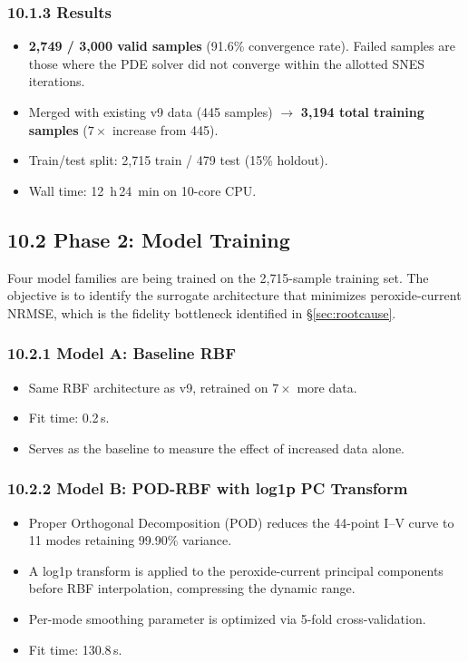 \documentclass[11pt]{article}
\begin{document}
\subsubsection*{10.1.3 Results}

\begin{itemize}
  \item \textbf{2{,}749 / 3{,}000 valid samples} (91.6\% convergence rate).
        Failed samples are those where the PDE solver did not converge within
        the allotted SNES iterations.
  \item Merged with existing v9 data (445 samples) $\to$
        \textbf{3{,}194 total training samples} ($7\times$ increase from 445).
  \item Train/test split: 2{,}715 train / 479 test (15\% holdout).
  \item Wall time: \SI{12}{h}\,\SI{24}{min} on 10-core CPU.
\end{itemize}

\subsection*{10.2 Phase 2: Model Training}

Four model families are being trained on the 2{,}715-sample training set.
The objective is to identify the surrogate architecture that minimizes
peroxide-current NRMSE, which is the fidelity bottleneck identified in
\S\ref{sec:rootcause}.

\subsubsection*{10.2.1 Model A: Baseline RBF}

\begin{itemize}
  \item Same RBF architecture as v9, retrained on $7\times$ more data.
  \item Fit time: 0.2\,s.
  \item Serves as the baseline to measure the effect of increased data alone.
\end{itemize}

\subsubsection*{10.2.2 Model B: POD-RBF with log1p PC Transform}

\begin{itemize}
  \item Proper Orthogonal Decomposition (POD) reduces the 44-point I--V curve
        to 11 modes retaining 99.90\% variance.
  \item A log1p transform is applied to the peroxide-current principal components
        before RBF interpolation, compressing the dynamic range.
  \item Per-mode smoothing parameter is optimized via 5-fold cross-validation.
  \item Fit time: 130.8\,s.
\end{itemize}
\end{document}
